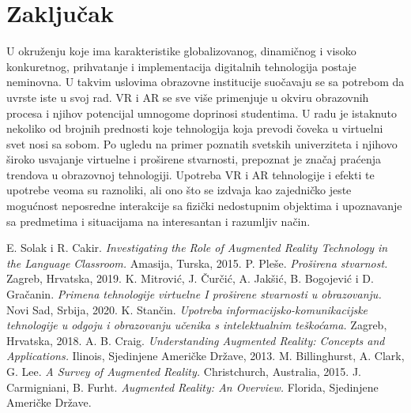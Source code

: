 \documentclass[a4paper]{article}
\begin{document}
	\section{Zaključak}
	\label{sec:Zaključak}
	U okruženju koje ima karakteristike globalizovanog, dinamičnog i visoko  konkuretnog, prihvatanje i implementacija digitalnih 
	tehnologija postaje neminovna. U takvim uslovima obrazovne institucije suočavaju se sa potrebom da uvrste iste u svoj rad. VR i AR se sve više primenjuje
	u okviru obrazovnih procesa i njihov potencijal umnogome doprinosi studentima. U radu je istaknuto nekoliko od brojnih prednosti koje tehnologija koja prevodi
	čoveka u virtuelni svet nosi sa sobom. Po ugledu na primer poznatih svetskih univerziteta i njihovo široko usvajanje virtuelne i proširene stvarnosti, prepoznat 
	je značaj praćenja trendova u obrazovnoj tehnologiji. Upotreba VR i AR tehnologije i efekti te upotrebe veoma su raznoliki, ali ono što se izdvaja kao zajedničko 
	jeste mogućnost neposredne interakcije sa fizički nedostupnim objektima i upoznavanje sa predmetima i situacijama na interesantan i razumljiv način.
	

        
        \begin{thebibliography}{9}
         E. Solak i R. Cakir. \emph{Investigating the Role of Augmented Reality Technology in the Language Classroom.} Amasija, 
	Turska, 2015.
         P. Pleše. \emph{Proširena stvarnost.} Zagreb, Hrvatska, 2019.
         K. Mitrović, J. Čurčić, A. Jakšić, B. Bogojević i D. Gračanin. \emph{Primena tehnologije virtuelne I proširene 
	stvarnosti u obrazovanju.} Novi Sad, Srbija, 2020.
         K. Stančin. \emph{Upotreba informacijsko-komunikacijske tehnologije u odgoju i obrazovanju učenika s 
	intelektualnim teškoćama.} Zagreb, Hrvatska, 2018.
         A. B. Craig. \emph{Understanding Augmented Reality: Concepts and Applications.} Ilinois, Sjedinjene Američke 
	Države, 2013.
		 M. Billinghurst, A. Clark, G. Lee. \emph{A Survey of Augmented Reality.} Christchurch, Australia, 2015.
         J. Carmigniani, B. Furht. \emph{Augmented Reality: An Overview.} Florida, Sjedinjene Američke Države.
 
        \end{thebibliography}
\end{document}
